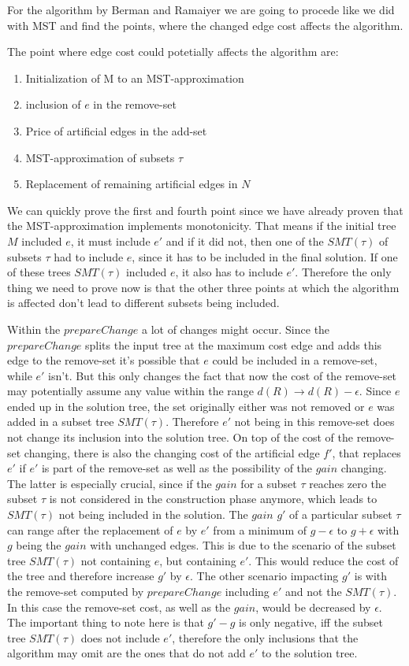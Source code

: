 For the algorithm by Berman and Ramaiyer we are going to procede like we did with MST and find the points, where the changed edge cost affects the algorithm.

The point where edge cost could potetially affects the algorithm are:
\begin{enumerate}
\item Initialization of M to an MST-approximation
\item inclusion of $e$ in the remove-set
\item Price of artificial edges in the add-set
\item MST-approximation of subsets $\tau$
\item Replacement of remaining artificial edges in $N$
\end{enumerate}

We can quickly prove the first and fourth point since we have already proven that the MST-approximation implements monotonicity. That means if the initial tree $M$ included $e$, it must include $e'$ and if it did not, then one of the $SMT(\tau)$ of subsets $\tau$ had to include $e$, since it has to be included in the final solution. If one of these trees $SMT(\tau)$ included $e$, it also has to include $e'$. Therefore the only thing we need to prove now is that the other three points at which the algorithm is affected don't lead to different subsets being included. 

Within the $prepareChange$ a lot of changes might occur. Since the $prepareChange$ splits the input tree at the maximum cost edge and adds this edge to the remove-set it's possible that $e$ could be included in a remove-set, while $e'$ isn't. But this only changes the fact that now the cost of the remove-set may potentially assume any value within the range $d(R) \to d(R)-\epsilon$. Since $e$ ended up in the solution tree, the set originally either was not removed or $e$ was added in a subset tree $SMT(\tau)$. Therefore $e'$ not being in this remove-set does not change its inclusion into the solution tree. On top of the cost of the remove-set changing, there is also the changing cost of the artificial edge $f'$, that replaces $e'$ if $e'$ is part of the remove-set as well as the possibility of the $gain$ changing. The latter is especially crucial, since if the $gain$ for a subset $\tau$ reaches zero the subset $\tau$ is not considered in the construction phase anymore, which leads to $SMT(\tau)$ not being included in the solution. The $gain$ $g'$ of a particular subset $\tau$ can range after the replacement of $e$ by $e'$ from a minimum of $g-\epsilon$ to $g+\epsilon$ with $g$ being the $gain$ with unchanged edges. This is due to the scenario of the subset tree $SMT(\tau)$ not containing $e$, but containing $e'$. This would reduce the cost of the tree and therefore increase $g'$ by $\epsilon$. The other scenario impacting $g'$ is with the remove-set computed by $prepareChange$ including $e'$ and not the $SMT(\tau)$. In this case the remove-set cost, as well as the $gain$, would be decreased by $\epsilon$. 
The important thing to note here is that $g'-g$ is only negative, iff the subset tree $SMT(\tau)$ does not include $e'$, therefore the only inclusions that the algorithm may omit are the ones that do not add $e'$ to the solution tree.  

